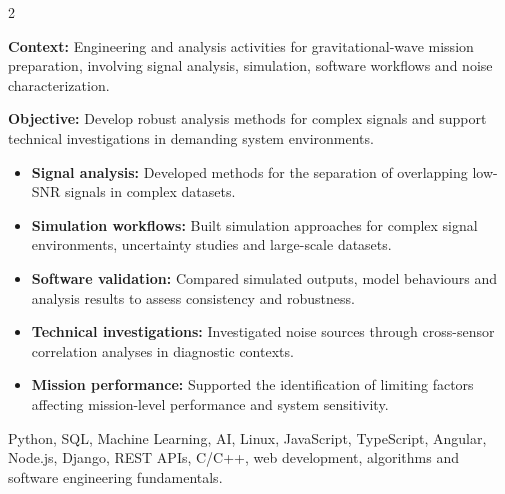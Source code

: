 \documentclass[8pt,a4paper,ragged2e,withhyper]{../_shared/altacv}
\begin{document}
\begin{paracol}{2}
\divider


\textbf{Context:} Engineering and analysis activities for gravitational-wave mission preparation, involving signal analysis, simulation, software workflows and noise characterization.

\textbf{Objective:} Develop robust analysis methods for complex signals and support technical investigations in demanding system environments.

\begin{itemize}
  \item \textbf{Signal analysis:} Developed methods for the separation of overlapping low-SNR signals in complex datasets.
  \item \textbf{Simulation workflows:} Built simulation approaches for complex signal environments, uncertainty studies and large-scale datasets.
  \item \textbf{Software validation:} Compared simulated outputs, model behaviours and analysis results to assess consistency and robustness.
  \item \textbf{Technical investigations:} Investigated noise sources through cross-sensor correlation analyses in diagnostic contexts.
  \item \textbf{Mission performance:} Supported the identification of limiting factors affecting mission-level performance and system sensitivity.
\end{itemize}



\divider


\divider


\small{
Python, SQL, Machine Learning, AI, Linux, JavaScript, TypeScript, Angular, Node.js, Django, REST APIs, C/C++, web development, algorithms and software engineering fundamentals.
}

\switchcolumn


\end{paracol}
\end{document}

